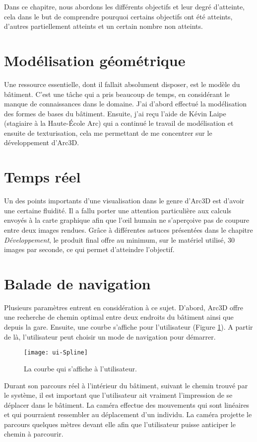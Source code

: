 Dans ce chapitre, nous abordons les différents objectifs et leur degré d'atteinte, cela dans le but de comprendre pourquoi certains objectifs ont été atteints, d'autres partiellement atteints et un certain nombre non atteints.

\section{Modélisation géométrique}
Une ressource essentielle, dont il fallait absolument disposer, est le modèle du bâtiment. C'est une tâche qui a pris beaucoup de temps, en considérant le manque de connaissances dans le domaine. J'ai d'abord effectué la modélisation des formes de bases du bâtiment. Ensuite, j'ai reçu l'aide de Kévin Laipe (stagiaire à la Haute-École Arc) qui a continué le travail de modélisation et ensuite de texturisation, cela me permettant de me concentrer sur le développement d'Arc3D.

\section{Temps réel}
Un des points importants d'une visualisation dans le genre d'Arc3D est d'avoir une certaine fluidité. Il a fallu porter une attention particulière aux calculs envoyés à la carte graphique afin que l'œil humain ne s'aperçoive pas de coupure entre deux images rendues. Grâce à différentes astuces présentées dans le chapitre \emph{Développement}, le produit final offre au minimum, sur le matériel utilisé, 30 images par seconde, ce qui permet d'atteindre l'objectif.

\section{Balade de navigation}
Plusieurs paramètres entrent en considération à ce sujet. D'abord, Arc3D offre une recherche de chemin optimal entre deux endroits du bâtiment ainsi que depuis la gare. Ensuite, une courbe s'affiche pour l'utilisateur (Figure \ref{fig:ui-spline}). A partir de là, l'utilisateur peut choisir un mode de navigation pour démarrer.

\begin{figure}[H]
	\centering
	\texttt{[image: ui-Spline]}
	\caption{La courbe qui s'affiche à l'utilisateur.}
	\label{fig:ui-spline}
\end{figure}

Durant son parcours réel à l'intérieur du bâtiment, suivant le chemin trouvé par le système, il est important que l'utilisateur ait vraiment l'impression de se déplacer dans le bâtiment. La caméra effectue des mouvements qui sont linéaires et qui pourraient ressembler au déplacement d'un individu. La caméra projette le parcours quelques mètres devant elle afin que l'utilisateur puisse anticiper le chemin à parcourir.


